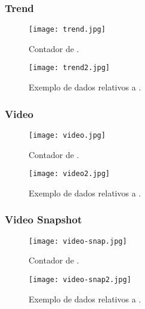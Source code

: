 \subsubsection{Trend}

\begin{figure}[H]
  \centering
  \begin{minipage}[b]{0.25\textwidth}
      \centering
      \texttt{[image: trend.jpg]}
      \caption{Contador de .}
  \end{minipage}
  \hspace{0.05\textwidth}
  \begin{minipage}[b]{0.6\textwidth}
      \centering
      \texttt{[image: trend2.jpg]}
      \caption{Exemplo de dados relativos a .}
  \end{minipage}
\end{figure}

\subsubsection{Video}

\begin{figure}[H]
  \centering
  \begin{minipage}[b]{0.25\textwidth}
      \centering
      \texttt{[image: video.jpg]}
      \caption{Contador de .}
  \end{minipage}
  \hspace{0.05\textwidth}
  \begin{minipage}[b]{0.6\textwidth}
      \centering
      \texttt{[image: video2.jpg]}
      \caption{Exemplo de dados relativos a .}
  \end{minipage}
\end{figure}

\subsubsection{Video Snapshot}

\begin{figure}[H]
  \centering
  \texttt{[image: video-snap.jpg]}
  \caption{Contador de .}
\end{figure}

\begin{figure}[H]
  \centering
  \texttt{[image: video-snap2.jpg]}
  \caption{Exemplo de dados relativos a .}
\end{figure}
